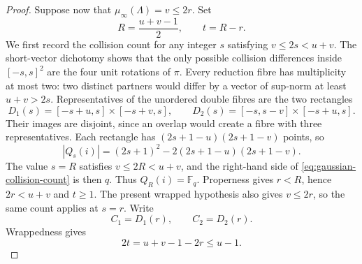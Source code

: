 \documentclass[11pt,a4paper]{article}
\theoremstyle{definition}
\theoremstyle{remark}
\newcommand{\Fq}{\mathbb{F}_q}
\begin{document}
\begin{proof}
  Suppose now that $\mu_\infty(\Lambda)=v\leq2r$.
  Set
  \[
    R=\frac{u+v-1}{2},
    \qquad
    t=R-r.
  \]
  We first record the collision count for any integer $s$ satisfying
  $v\leq2s<u+v$.
  The short-vector dichotomy shows that the only possible collision differences inside
  $[-s,s]^2$ are the four unit rotations of $\pi$.
  Every reduction fibre has multiplicity at most two: two distinct partners would differ
  by a vector of sup-norm at least $u+v>2s$.
  Representatives of the unordered double fibres are the two rectangles
  \[
    D_1(s)=[-s+u,s]\times[-s+v,s],
    \qquad
    D_2(s)=[-s,s-v]\times[-s+u,s].
  \]
  Their images are disjoint, since an overlap would create a fibre with three
  representatives.
  Each rectangle has $(2s+1-u)(2s+1-v)$ points, so
  \begin{equation}
    |Q_s(i)|=(2s+1)^2-2(2s+1-u)(2s+1-v).
    \label{eq:gaussian-collision-count}
  \end{equation}
  The value $s=R$ satisfies $v\leq2R<u+v$, and the right-hand side of
  \eqref{eq:gaussian-collision-count} is then $q$.
  Thus $Q_R(i)=\Fq$.
  Properness gives $r<R$, hence $2r<u+v$ and $t\geq1$.
  The present wrapped hypothesis also gives $v\leq2r$, so the same count applies at
  $s=r$.
  Write
  \[
    C_1=D_1(r),
    \qquad
    C_2=D_2(r).
  \]
  Wrappedness gives
  \begin{equation}
    2t=u+v-1-2r\leq u-1.
    \label{eq:gaussian-wrapped-bound}
  \end{equation}


\end{proof}
\end{document}
